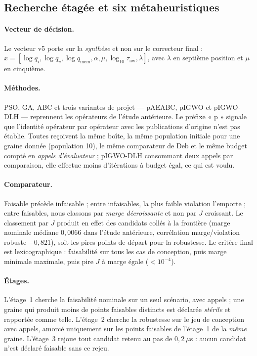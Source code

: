 \subsection{Recherche étagée et six métaheuristiques}
\label{sec:recherche}

\paragraph{Vecteur de décision.}
Le vecteur v5 porte sur la \emph{synthèse} et non sur le correcteur final :
$x=[\log q_i,\log q_v,\log q_\mathrm{mem},\alpha,\mu,\log_{10}\tau_\mathrm{aw},\lambda]$,
avec $\lambda$ en septième position et $\mu$ en cinquième.

\paragraph{Méthodes.}
PSO, GA, ABC et trois variantes de projet --- pAEABC, pIGWO et pIGWO-DLH ---
reprennent les opérateurs de l'étude antérieure. Le préfixe « p » signale que
l'identité opérateur par opérateur avec les publications d'origine n'est pas
établie. Toutes reçoivent la même boîte, la même population initiale pour une
graine donnée (population 10), le même comparateur de Deb et le même budget
compté en \emph{appels d'évaluateur} ; pIGWO-DLH consommant deux appels par
comparaison, elle effectue moins d'itérations à budget égal, ce qui est voulu.

\paragraph{Comparateur.}
Faisable précède infaisable ; entre infaisables, la plus faible violation
l'emporte ; entre faisables, nous classons par \emph{marge décroissante} et non
par $J$ croissant. Le classement par $J$ produit en effet des candidats collés
à la frontière (marge nominale médiane $0{,}0066$ dans l'étude antérieure,
corrélation marge/violation robuste $-0{,}821$), soit les pires points de
départ pour la robustesse. Le critère final est lexicographique : faisabilité
sur tous les cas de conception, puis marge minimale maximale, puis pire $J$ à
marge égale ($<10^{-4}$).

\paragraph{Étages.}
L'étage~1 cherche la faisabilité nominale sur un seul scénario, avec
\ChiffreBudgetUn{} appels ; une graine qui produit moins de
\ChiffreMinFaisables{} points faisables distincts est déclarée
\emph{stérile} et rapportée comme telle. L'étage~2 cherche la robustesse sur
le jeu de conception avec \ChiffreBudgetDeux{} appels, amorcé uniquement sur
les points faisables de l'étage~1 de la \emph{même} graine. L'étage~3 rejoue
tout candidat retenu au pas de $0{,}2~\mu$s : aucun candidat n'est déclaré
faisable sans ce rejeu.

